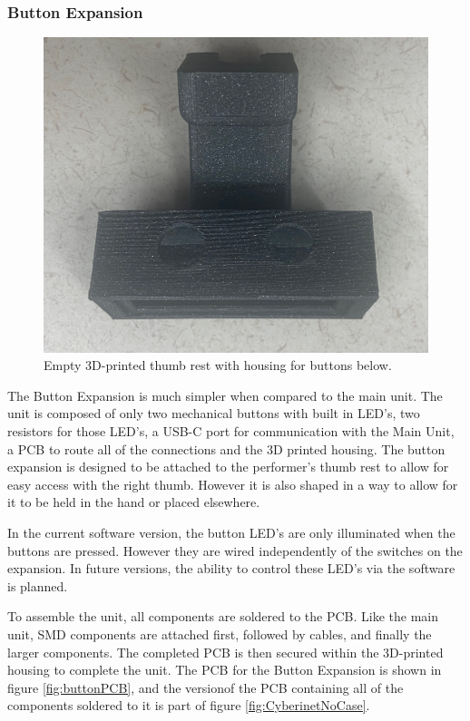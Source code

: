 \subsubsection{Button Expansion}

\begin{center}
    \begin{figure}
        \centering
        \includegraphics[scale=0.1]{diagrams/builtUnits/buttonhousingEmpty.JPG}
        \caption{Empty 3D-printed thumb rest with housing for buttons below.}
        \label{fig:buttonThumbrest}
    \end{figure}
\end{center}


The Button Expansion is much simpler when compared to the main unit. The unit is composed of only two mechanical buttons with built in LED's, two resistors for those LED's, a USB-C port for communication with the Main Unit, a PCB to route all of the connections and the 3D printed housing. The button expansion is designed to be attached to the performer's thumb rest to allow for easy access with the right thumb. However it is also shaped in a way to allow for it to be held in the hand or placed elsewhere.

In the current software version, the button LED's are only illuminated when the buttons are pressed. However they are wired independently of the switches on the expansion. In future versions, the ability to control these LED's via the software is planned.

To assemble the unit, all components are soldered to the PCB. Like the main unit, SMD components are attached first, followed by cables, and finally the larger components. The completed PCB is then secured within the 3D-printed housing to complete the unit. The PCB for the Button Expansion is shown in figure \ref{fig:buttonPCB}, and the versionof the PCB containing all of the components soldered to it is part of figure \ref{fig:CyberinetNoCase}.


